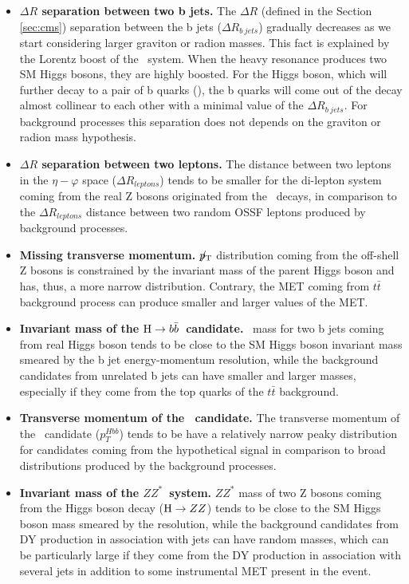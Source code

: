 \begin{itemize}

\item{\bfseries $\Delta R$ separation between two b jets.}
The $\Delta R$ (defined in the Section \ref{sec:cms}) separation between the b jets ($\Delta R_{b\ jets}$) gradually decreases as we start considering larger graviton or radion masses. This fact is explained by the Lorentz boost of the \HBB~system. When the heavy resonance produces two SM Higgs bosons, they are highly boosted. For the Higgs boson, which will further decay to a pair of b quarks (\HBB), the b quarks will come out of the decay almost collinear to each other with a minimal value of the $\Delta R_{b\ jets}$. For background processes this separation does not depends on the graviton or radion mass hypothesis. 

\item{\bfseries $\Delta R$ separation between two leptons.}
The distance between two leptons in the $\eta - \varphi$ space ($\Delta R_{leptons}$) tends to be smaller for the di-lepton system coming from the real Z bosons originated from the \HZZ~decays, in comparison to the $\Delta R_{leptons}$ distance between two random OSSF leptons produced by background processes. 

\item{\bfseries Missing transverse momentum.}
${p}_\mathrm{T}\hspace{-1.02em}/\kern 0.5em$ distribution coming from the off-shell Z bosons is constrained by the invariant mass of the parent Higgs boson and has, thus, a more narrow distribution. Contrary, the MET coming from $t\bar{t}$ background process can produce smaller and larger values of the MET. 

\item{\bfseries Invariant mass of the $\mathrm{H}\to b\bar{b}$~candidate.} 
\HBB~mass for two b jets coming from real Higgs boson tends to be close to the SM Higgs boson invariant mass smeared by the b jet energy-momentum resolution, while the background candidates from unrelated b jets can have smaller and larger masses, especially if they come from the top quarks of the $t\bar{t}$ background.
           
\item{\bfseries Transverse momentum of the \HBB~candidate.} 
The transverse momentum of the \HBB~candidate ($p_T^{Hbb}$) tends to be have a relatively narrow peaky distribution for candidates coming from the hypothetical signal in comparison to broad distributions produced by the background processes. 

\item{\bfseries Invariant mass of the $ZZ^*$~system.} 
$ZZ^*$ mass of two Z bosons coming from the Higgs boson decay ($\mathrm{H}\rightarrow ZZ$) tends to be close to the SM Higgs boson mass smeared by the \PTslash resolution, while the background candidates from DY production in association with jets can have random masses, which can be particularly large if they come from the DY production in association with several jets in addition to some instrumental MET present in the event.


\end{itemize}
